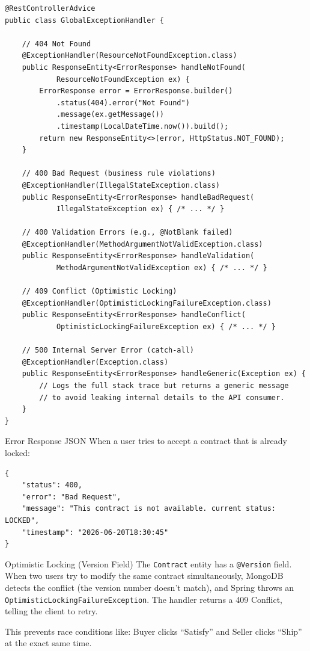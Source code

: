 \documentclass[11pt, a4paper]{article}
\begin{document}
\begin{lstlisting}[caption={GlobalExceptionHandler.java -- Centralized Error Handling}]
@RestControllerAdvice
public class GlobalExceptionHandler {

    // 404 Not Found
    @ExceptionHandler(ResourceNotFoundException.class)
    public ResponseEntity<ErrorResponse> handleNotFound(
            ResourceNotFoundException ex) {
        ErrorResponse error = ErrorResponse.builder()
            .status(404).error("Not Found")
            .message(ex.getMessage())
            .timestamp(LocalDateTime.now()).build();
        return new ResponseEntity<>(error, HttpStatus.NOT_FOUND);
    }

    // 400 Bad Request (business rule violations)
    @ExceptionHandler(IllegalStateException.class)
    public ResponseEntity<ErrorResponse> handleBadRequest(
            IllegalStateException ex) { /* ... */ }

    // 400 Validation Errors (e.g., @NotBlank failed)
    @ExceptionHandler(MethodArgumentNotValidException.class)
    public ResponseEntity<ErrorResponse> handleValidation(
            MethodArgumentNotValidException ex) { /* ... */ }

    // 409 Conflict (Optimistic Locking)
    @ExceptionHandler(OptimisticLockingFailureException.class)
    public ResponseEntity<ErrorResponse> handleConflict(
            OptimisticLockingFailureException ex) { /* ... */ }

    // 500 Internal Server Error (catch-all)
    @ExceptionHandler(Exception.class)
    public ResponseEntity<ErrorResponse> handleGeneric(Exception ex) {
        // Logs the full stack trace but returns a generic message
        // to avoid leaking internal details to the API consumer.
    }
}
\end{lstlisting}

\begin{examplebox}{Error Response JSON}
When a user tries to accept a contract that is already locked:
\begin{lstlisting}[style=yamlstyle]
{
    "status": 400,
    "error": "Bad Request",
    "message": "This contract is not available. current status: LOCKED",
    "timestamp": "2026-06-20T18:30:45"
}
\end{lstlisting}
\end{examplebox}

\begin{conceptbox}{Optimistic Locking (Version Field)}
The \texttt{Contract} entity has a \texttt{@Version} field. When two users try to modify the same contract simultaneously, MongoDB detects the conflict (the version number doesn't match), and Spring throws an \texttt{OptimisticLockingFailureException}. The handler returns a 409 Conflict, telling the client to retry.

This prevents race conditions like: Buyer clicks ``Satisfy'' and Seller clicks ``Ship'' at the exact same time.
\end{conceptbox}
\end{document}
